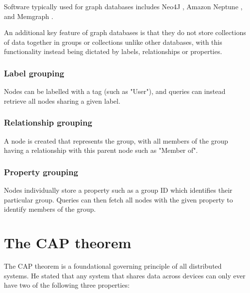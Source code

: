 \para Software typically used for graph databases includes Neo4J \autocite{neo4jNeo4jGraphDatabase2025}, Amazon 
Neptune \autocite{awsManagedGraphDatabase}, and Memgraph \autocite{memgraphMemgraphDatabase}.

\para An additional key feature of graph databases is that they do not store collections of data together in groups or collections 
unlike other databases, with this functionality instead being dictated by labels, relationships or properties. 

\subsubsection{Label grouping}
Nodes can be labelled with a tag (such as "User"), and queries can instead retrieve all nodes sharing a given label.

\subsubsection{Relationship grouping}
A node is created that represents the group, with all members of the group having a relationship with this parent node such as "Member of".

\subsubsection{Property grouping}
Nodes individually store a property such as a group ID which identifies their particular group. Queries can then fetch all nodes with the given 
property to identify members of the group.

\section{The CAP theorem}\label{sec:CAPTheorem}
The CAP theorem \autocite{brewerRobustDistributedSystems2000} is a foundational governing principle of all distributed systems. He stated that any 
system that shares data across devices can only ever have two of the following three properties:


